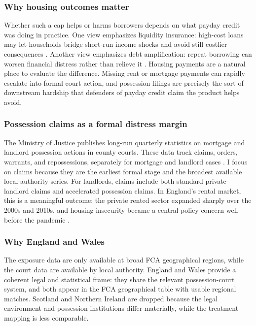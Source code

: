 \documentclass[12pt]{article}
\begin{document}
\subsubsection*{Why housing outcomes matter}
Whether such a cap helps or harms borrowers depends on what payday credit was doing in practice. One view emphasizes liquidity insurance: high-cost loans may let households bridge short-run income shocks and avoid still costlier consequences \citep{morse2011, stegman2007}. Another view emphasizes debt amplification: repeat borrowing can worsen financial distress rather than relieve it \citep{melzer2011, bhutta2014}. Housing payments are a natural place to evaluate the difference. Missing rent or mortgage payments can rapidly escalate into formal court action, and possession filings are precisely the sort of downstream hardship that defenders of payday credit claim the product helps avoid.

\subsubsection*{Possession claims as a formal distress margin}
The Ministry of Justice publishes long-run quarterly statistics on mortgage and landlord possession actions in county courts. These data track claims, orders, warrants, and repossessions, separately for mortgage and landlord cases \citep{moj2025possession}. I focus on claims because they are the earliest formal stage and the broadest available local-authority series. For landlords, claims include both standard private-landlord claims and accelerated possession claims. In England's rental market, this is a meaningful outcome: the private rented sector expanded sharply over the 2000s and 2010s, and housing insecurity became a central policy concern well before the pandemic \citep{fitzpatrick2016, rugg2018, gibbons2021}.

\subsubsection*{Why England and Wales}
The exposure data are only available at broad FCA geographical regions, while the court data are available by local authority. England and Wales provide a coherent legal and statistical frame: they share the relevant possession-court system, and both appear in the FCA geographical table with usable regional matches. Scotland and Northern Ireland are dropped because the legal environment and possession institutions differ materially, while the treatment mapping is less comparable.
\end{document}
